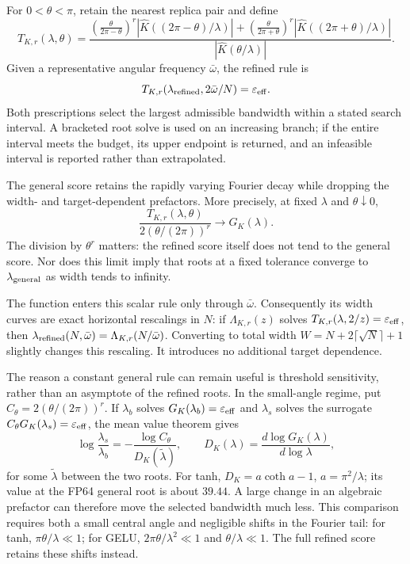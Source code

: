 For $0<\theta<\pi$, retain the nearest replica pair and define
\begin{equation}
 T_{K,r}(\lambda,\theta)=
 \frac{
 \left(\frac{\theta}{2\pi-\theta}\right)^r
   |\widehat K((2\pi-\theta)/\lambda)|
 +\left(\frac{\theta}{2\pi+\theta}\right)^r
   |\widehat K((2\pi+\theta)/\lambda)|}
 {|\widehat K(\theta/\lambda)|}.
 \label{eq:bw-first-pair}
\end{equation}
Given a representative angular frequency $\bar\omega$, the refined rule is
\begin{equation}
 T_{K,r}(\lambda_{\rm refined},2\bar\omega/N)
 =\varepsilon_{\rm eff}.
 \label{eq:bw-refined-root}
\end{equation}
Both prescriptions select the largest admissible bandwidth within a stated
search interval. A bracketed root solve is used on an increasing branch;
if the entire interval meets the budget, its upper endpoint is returned,
and an infeasible interval is reported rather than extrapolated.

The general score retains the rapidly varying Fourier decay while dropping
the width- and target-dependent prefactors. More precisely, at fixed
$\lambda$ and $\theta\downarrow0$,
\begin{equation}
 \frac{T_{K,r}(\lambda,\theta)}{2(\theta/(2\pi))^r}
 \longrightarrow G_K(\lambda).
 \label{eq:bw-general-refined-limit}
\end{equation}
The division by $\theta^r$ matters: the refined score itself does not tend
to the general score. Nor does this limit imply that roots at a fixed
tolerance converge to $\lambda_{\rm general}$ as width tends to infinity.

The function enters this scalar rule only through $\bar\omega$.
Consequently its width curves are exact horizontal rescalings in $N$:
if $\Lambda_{K,r}(z)$ solves $T_{K,r}(\lambda,2/z)=\varepsilon_{\rm eff}$,
then $\lambda_{\rm refined}(N,\bar\omega)=\Lambda_{K,r}(N/\bar\omega)$.
Converting to total width $W=N+2\lceil\sqrt N\rceil+1$ slightly changes this
rescaling. It introduces no additional target dependence.

The reason a constant general rule can remain useful is threshold
sensitivity, rather than an asymptote of the refined roots. In the
small-angle regime, put $C_\theta=2(\theta/(2\pi))^r$. If $\lambda_b$ solves
$G_K(\lambda_b)=\varepsilon_{\rm eff}$ and $\lambda_s$ solves the surrogate
$C_\theta G_K(\lambda_s)=\varepsilon_{\rm eff}$, the mean value theorem gives
\begin{equation}
 \log\frac{\lambda_s}{\lambda_b}
 =-\frac{\log C_\theta}{D_K(\widetilde\lambda)},\qquad
 D_K(\lambda)=\frac{d\log G_K(\lambda)}{d\log\lambda},
 \label{eq:bw-threshold-sensitivity}
\end{equation}
for some $\widetilde\lambda$ between the two roots. For tanh,
$D_K=a\coth a-1$, $a=\pi^2/\lambda$; its value at the FP64 general root is
about $39.44$. A large change in an algebraic prefactor can therefore move
the selected bandwidth much less. This comparison requires both a small
central angle and negligible shifts in the Fourier tail: for tanh,
$\pi\theta/\lambda\ll1$; for GELU, $2\pi\theta/\lambda^2\ll1$ and
$\theta/\lambda\ll1$. The full refined score retains these shifts instead.

